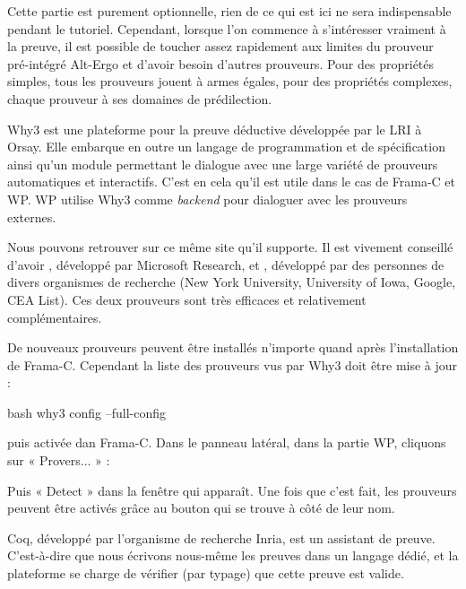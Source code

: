 

Cette partie est purement optionnelle, rien de ce qui est ici ne sera
indispensable pendant le tutoriel. Cependant, lorsque l'on commence à
s'intéresser vraiment à la preuve, il est possible de toucher assez rapidement
aux limites du prouveur pré-intégré Alt-Ergo et d'avoir besoin d'autres
prouveurs. Pour des propriétés simples, tous les prouveurs jouent à armes
égales, pour des propriétés complexes, chaque prouveur à ses domaines de
prédilection.



Why3 est une plateforme pour la preuve déductive développée par le LRI à Orsay.
Elle embarque en outre un langage de programmation et de spécification ainsi
qu'un module permettant le dialogue avec une large variété de prouveurs
automatiques et interactifs. C'est en cela qu'il est utile dans le cas de
Frama-C et WP. WP utilise Why3 comme \textit{backend} pour dialoguer avec les
prouveurs externes.


Nous pouvons retrouver sur ce même site
 qu'il supporte.
Il est vivement conseillé d'avoir ,
développé par Microsoft Research, et ,
développé par des personnes de divers organismes de recherche (New York
University, University of Iowa, Google, CEA List). Ces deux prouveurs sont très
efficaces et relativement complémentaires.


De nouveaux prouveurs peuvent être installés n'importe quand après
l'installation de Frama-C. Cependant la liste des prouveurs vus par Why3
doit être mise à jour :


\begin{CodeBlock}{bash}
why3 config --full-config
\end{CodeBlock}


puis activée dan Frama-C. Dans le panneau latéral, dans la partie WP,
cliquons sur « Provers... » :




Puis « Detect » dans la fenêtre qui apparaît. Une fois que c'est fait,
les prouveurs peuvent être activés grâce au bouton qui se trouve à côté
de leur nom.






Coq, développé par l'organisme de recherche Inria, est un assistant de
preuve. C'est-à-dire que nous écrivons nous-même les preuves dans un
langage dédié, et la plateforme se charge de vérifier (par typage) que
cette preuve est valide.



